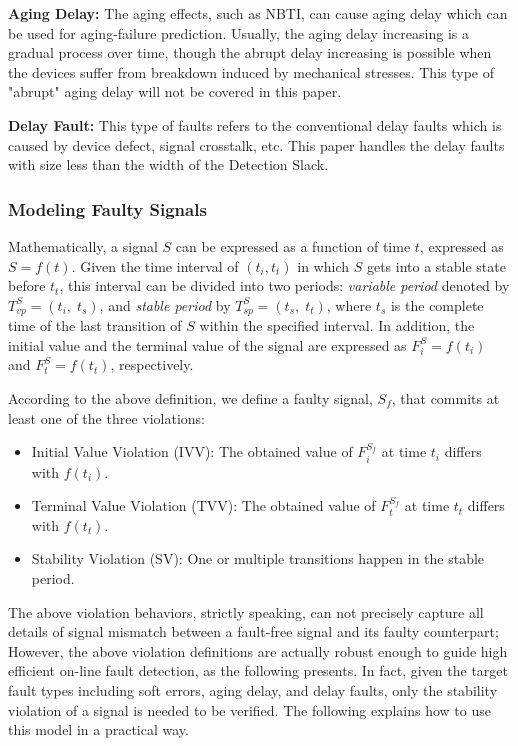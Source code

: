 {\bf Aging Delay:} The aging effects, such as NBTI, can cause aging delay which can be used for aging-failure prediction\cite{failure_prediction_07}. Usually, the aging delay increasing is a gradual process over time, though the abrupt delay increasing is possible when the devices suffer from breakdown induced by mechanical stresses. This type of "abrupt" aging delay will not be covered in this paper.

{\bf Delay Fault:} This type of faults refers to the conventional delay faults \cite{sensing_96} which is caused by device defect, signal crosstalk, etc. This
paper handles the delay faults with size less than the width of the Detection Slack.

\subsubsection{Modeling Faulty Signals}
Mathematically, a signal $S$ can be expressed as a function of time $t$, expressed as $S = f(t)$. Given the time interval of $(t_i, t_t)$ in which $S$ gets into a stable state before $t_t$, this interval can be divided into two periods: \emph{variable period} denoted by $T_{vp}^S=(t_i,\;t_{s})$, and \emph{stable period} by $T_{sp}^S=(t_{s},\;t_{t})$, where $t_{s}$ is the complete time of the last transition of $S$ within the specified interval. In addition, the initial value and the terminal value of the signal are expressed as $F_i^S = f(t_i)$ and $F_t^S=f(t_t)$, respectively.

According to the above definition, we define a faulty signal, $S_f$, that commits at least one of the three violations:
\begin{itemize}
  \item Initial Value Violation (IVV): The obtained value of $F_i^{S_f}$ at time $t_i$ differs with
   $f(t_i)$.
  \item Terminal Value Violation (TVV): The obtained value of $F_t^{S_f}$ at time $t_t$ differs with
   $f(t_t)$.
  \item Stability Violation (SV): One or multiple transitions happen in the stable period.
\end{itemize}


The above violation behaviors, strictly speaking, can not precisely capture all details of signal mismatch between a fault-free signal and its faulty counterpart; However, the above violation definitions are actually robust enough to guide high efficient on-line fault detection, as the following presents. In fact, given the target fault types including soft errors, aging delay, and delay faults, only the stability violation of a signal is needed to be verified. The following explains how to use this model in a practical way.

